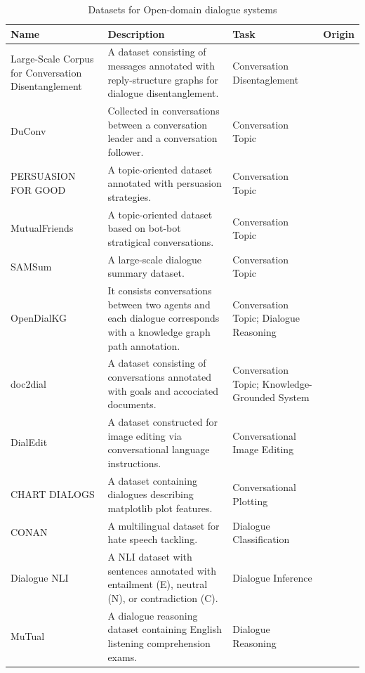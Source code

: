 \begin{longtable}{>{\centering\arraybackslash}y{2.5cm} y{5cm} >{\centering\arraybackslash}y{2cm} >{\centering\arraybackslash}y{2.5cm}}
\caption{Datasets for Open-domain dialogue systems}
\label{Datasets for Open-domain dialogue systems} 
\\\hline
\textbf{Name}	&	\centering\arraybackslash\textbf{Description}	&	\centering\arraybackslash\textbf{Task}	&	 \textbf{Origin} \\\hline
Large-Scale Corpus for Conversation Disentanglement	&	A dataset consisting of messages annotated with reply-structure graphs for dialogue disentanglement.	&	Conversation Disentaglement	&	~	 \\\hline
DuConv	&	Collected in conversations between a conversation leader and a conversation follower. 	&	Conversation Topic	&	~	 \\\hline
PERSUASION FOR GOOD	&	A topic-oriented dataset annotated with persuasion strategies.	&	Conversation Topic	&	~	 \\\hline
MutualFriends	&	A topic-oriented dataset based on bot-bot stratigical conversations.	&	Conversation Topic	&	~	 \\\hline
SAMSum	&	A large-scale dialogue summary dataset.	&	Conversation Topic	&	~	 \\\hline
OpenDialKG	&	It consists conversations between two agents and each dialogue corresponds with a knowledge graph path annotation.	&	Conversation Topic; Dialogue Reasoning	&	~	 \\\hline
doc2dial	&	A dataset consisting of conversations annotated with goals and accociated documents.	&	Conversation Topic; Knowledge-Grounded System	&	~	 \\\hline
DialEdit	&	A dataset constructed for image editing via conversational language instructions.	&	Conversational Image Editing	&	~	 \\\hline
CHART DIALOGS	&	A dataset containing dialogues describing matplotlib plot features.	&	Conversational Plotting	&	~	 \\\hline
CONAN	&	A multilingual dataset for hate speech tackling.	&	Dialogue Classification	&	~	 \\\hline
Dialogue NLI	&	A NLI dataset with sentences annotated with entailment (E), neutral (N), or contradiction (C).	&	Dialogue Inference	&	~	 \\\hline
MuTual	&	A dialogue reasoning dataset containing English listening comprehension exams.	&	Dialogue Reasoning	&	~	 \\\hline

\end{longtable}
